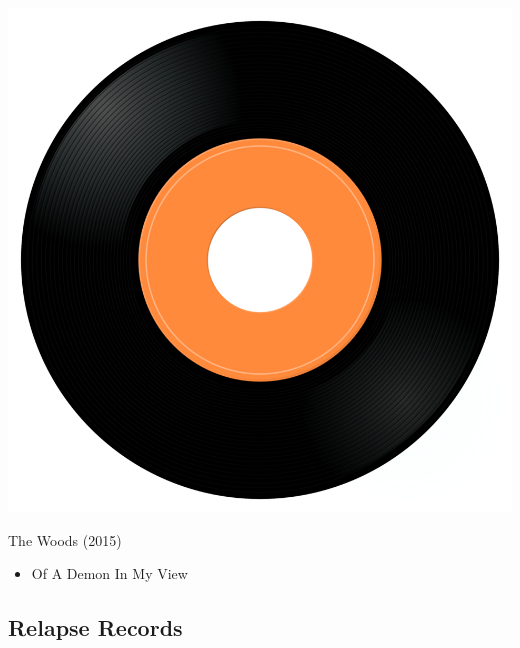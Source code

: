 \begin{minipage}[t]{0.25\textwidth}\vspace{0pt}
\captionsetup{type=figure}
\includegraphics[width=\textwidth]{Images/cover.png}
\caption*{The Woods (2015)}
\end{minipage}
\begin{minipage}[t]{0.25\textwidth}\vspace{0pt}
\begin{itemize}[nosep,leftmargin=1em,labelwidth=*,align=left]
	\setlength{\itemsep}{0pt}
	\item Of A Demon In My View
\end{itemize}
\end{minipage}

\subsection{Relapse Records}

